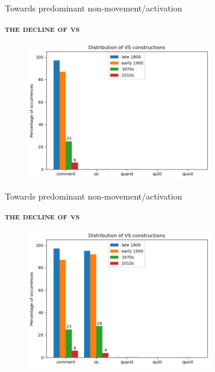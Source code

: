\documentclass[lesson_slides]{subfiles}
\begin{document}
\begin{frame}[c]{Towards predominant non-movement/activation}

    \textbf{\textsc{the decline of vs}}
    \begin{center}
        \includegraphics[width=10cm, height=6cm]{images/VS1.png}
    \end{center}
  
\end{frame}
\begin{frame}[c]{Towards predominant non-movement/activation}

    \textbf{\textsc{the decline of vs}}
    \begin{center}
        \includegraphics[width=10cm, height=6cm]{images/VS2.png}
    \end{center}
  
\end{frame}
\end{document}
